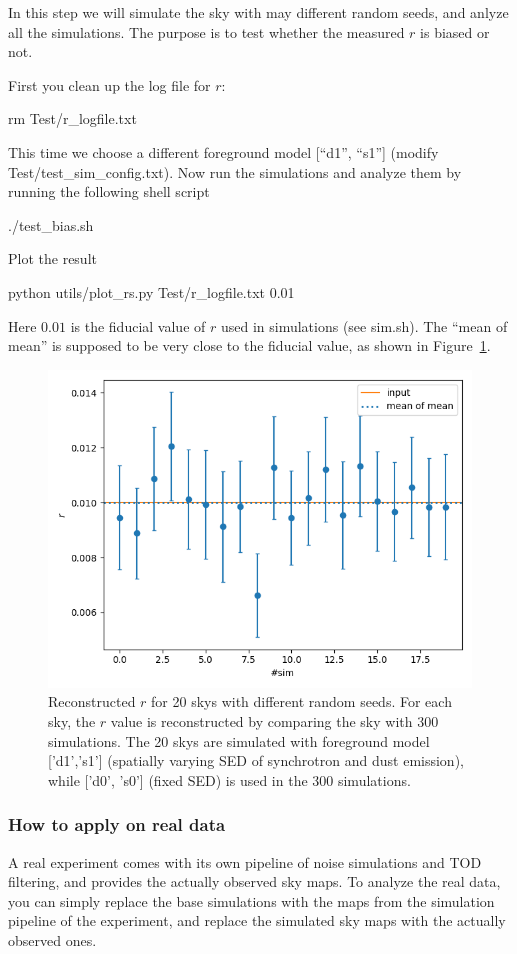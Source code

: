 \documentclass[12pt, a4paper]{ctexart} %
\def\tbox#1{\begin{tcolorbox}#1\end{tcolorbox}}
\begin{document}
In this step we will simulate the sky with may different random seeds, and anlyze all the simulations. The purpose is to test whether the measured $r$ is biased or not.

First you clean up the log file for $r$:
\tbox{rm Test/r\_logfile.txt}
This time we choose a different foreground model [``d1'', ``s1''] (modify Test/test\_sim\_config.txt). Now run the simulations and analyze them by running the following shell script
\tbox{./test\_bias.sh}
Plot the result
\tbox{python utils/plot\_rs.py Test/r\_logfile.txt 0.01}
Here $0.01$ is the fiducial value of $r$ used in simulations (see sim.sh). The ``mean of mean'' is supposed to be very close to the fiducial value, as shown in Figure~\ref{fig:r_logs}.
\begin{figure}
  \includegraphics[width=\textwidth]{r_logs.png}
  \caption{Reconstructed $r$ for 20 skys with different random seeds. For each sky, the $r$ value is reconstructed by comparing the sky with 300 simulations. The 20 skys are simulated with foreground model ['d1','s1'] (spatially varying SED of synchrotron and dust emission), while  ['d0', 's0'] (fixed SED) is used in the 300 simulations. \label{fig:r_logs}}
\end{figure}


\subsubsection{How to apply on real data}

A real experiment comes with its own pipeline of noise simulations and TOD filtering, and provides the actually observed sky maps. To analyze the real data, you can simply replace the base simulations with the maps from the simulation pipeline of the experiment, and replace the simulated sky maps with the actually observed ones.
\end{document}

